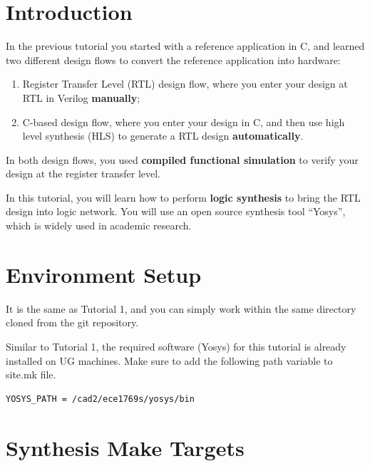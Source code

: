 \documentclass[12pt]{article}
\newcommand{\quotes}[1]{``#1''}
\begin{document}
\pagebreak


\section{Introduction}

In the previous tutorial you started with a reference application in
C, and learned two different design flows to convert the reference
application into hardware:

\begin{enumerate}
\item Register Transfer Level (RTL) design flow, where you enter your
  design at RTL in Verilog {\bf manually};
  
\item C-based design flow, where you enter your design in C, and then
  use high level synthesis (HLS) to generate a RTL design {\bf
    automatically}.
\end{enumerate}

In both design flows, you used {\bf compiled functional simulation} to
verify your design at the register transfer level.

In this tutorial, you will learn how to perform {\bf logic synthesis}
to bring the RTL design into logic network. You will use an open
source synthesis tool \quotes{Yosys}, which is widely used in academic
research.

\section{Environment Setup}

It is the same as Tutorial 1, and you can simply work within the same
directory cloned from the git repository.

Similar to Tutorial 1, the required software (Yosys) for this tutorial
is already installed on UG machines. Make sure to add the following
path variable to {site.mk} file.

\begin{lstlisting}[language=bash]
YOSYS_PATH = /cad2/ece1769s/yosys/bin
\end{lstlisting}

\section{Synthesis Make Targets}
\end{document}
